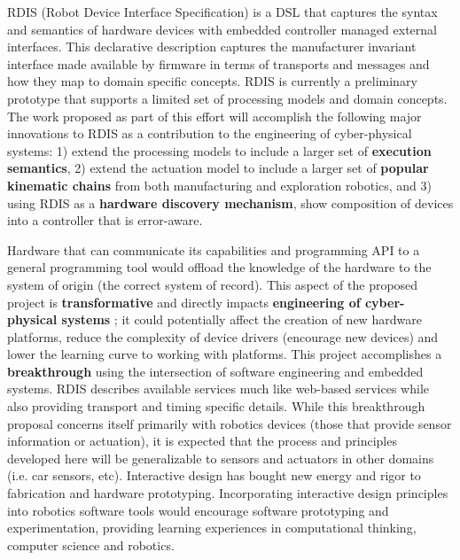 RDIS (Robot Device Interface Specification) \cite{Anderson2012} is a DSL that captures the syntax and semantics of hardware devices with embedded controller managed external interfaces.  This declarative description captures the manufacturer invariant interface made available by firmware in terms of transports and messages and how they map to domain specific concepts.  RDIS is currently a preliminary prototype that supports a limited set of processing models and domain concepts.  The work proposed as part of this effort will accomplish the following major innovations to RDIS as a contribution to the engineering of cyber-physical systems: 1) extend the processing models to include a larger set of {\bf execution semantics}, 2) extend the actuation model to include a larger set of {\bf popular kinematic chains} from both manufacturing and exploration robotics, and 3) using RDIS as a {\bf hardware discovery mechanism}, show composition of devices into a controller that is error-aware.   

Hardware that can communicate its capabilities and programming API to a general programming tool would offload the knowledge of the hardware to the system of origin (the correct system of record).  This aspect of the proposed project is {\bf transformative} and directly impacts {\bf engineering of cyber-physical systems} ; it could potentially affect the creation of new hardware platforms, reduce the complexity of device drivers (encourage new devices) and lower the learning curve to working with platforms.  This project accomplishes a {\bf breakthrough} using the intersection of software engineering and embedded systems.  RDIS describes available services much like web-based services while also providing transport and timing specific details.  While this breakthrough proposal concerns itself primarily with robotics devices (those that provide sensor information or actuation), it is expected that the process and principles developed here will be generalizable to sensors and actuators in other domains (i.e. car sensors, etc).  Interactive design has bought new energy and rigor to fabrication and hardware prototyping.  Incorporating interactive design principles into robotics software tools would encourage software prototyping and experimentation, providing learning experiences in computational thinking, computer science and robotics.  



